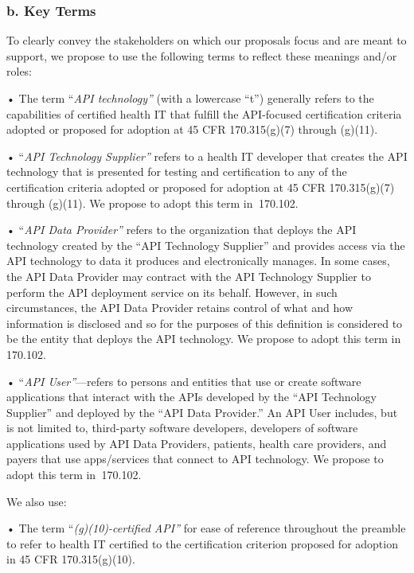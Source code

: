 \documentclass[twoside,11pt]{article}
\begin{document}
          \subsubsection{b. Key Terms}

          To clearly convey the stakeholders on which our proposals focus and are meant to support, we propose to use the following terms to reflect these meanings and/or roles:


          • The term “\emph{API technology”} (with a lowercase “t”) generally refers to the capabilities of certified health IT that fulfill the API-focused certification criteria adopted or proposed for adoption at 45 CFR 170.315(g)(7) through (g)(11).


          • “\emph{API Technology Supplier”} refers to a health IT developer that creates the API technology that is presented for testing and certification to any of the certification criteria adopted or proposed for adoption at 45 CFR 170.315(g)(7) through (g)(11). We propose to adopt this term in \textsection{} 170.102.


          • “\emph{API Data Provider”} refers to the organization that deploys the API technology created by the “API Technology Supplier” and provides access via the API technology to data it produces and electronically manages. In some cases, the API Data Provider may contract with the API Technology Supplier to perform the API deployment service on its behalf. However, in such circumstances, the API Data Provider retains control of what and how information is disclosed and so for the purposes of this definition is considered to be the entity that deploys the API technology. We propose to adopt this term in \textsection{} 170.102.


          • “\emph{API User”}—refers to persons and entities that use or create software applications that interact with the APIs developed by the “API Technology Supplier” and deployed by the “API Data Provider.” An API User includes, but is not limited to, third-party software developers, developers of software applications used by API Data Providers, patients, health care providers, and payers that use apps/services that connect to API technology. We propose to adopt this term in \textsection{} 170.102.


          We also use:


          • The term “\emph{(g)(10)-certified API”} for ease of reference throughout the preamble to refer to health IT certified to the certification criterion proposed for adoption in 45 CFR 170.315(g)(10).
\end{document}
